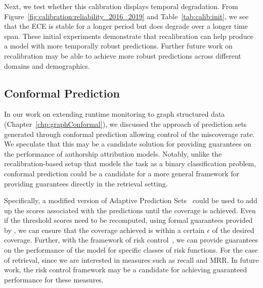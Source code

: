 Next, we test whether this calibration displays temporal degradation.
From Figure~\ref{fig:calibration:reliability_2016_2019} and Table~\ref{tab:calib:init}, we see that the ECE is stable for a longer period but does degrade over a longer time span.
These initial experiments demonstrate that recalibration can help produce a model with more temporally robust predictions.
Further future work on recalibration may be able to achieve more robust predictions across different domains and demographics.

\subsection{Conformal Prediction}
In our work on extending runtime monitoring to graph structured data (Chapter~\ref{chp:graphConformal}), we discussed the approach of prediction sets generated through conformal prediction allowing control of the miscoverage rate.
We speculate that this may be a candidate solution for providing guarantees on the performance of authorship attribution models.
Notably, unlike the recalibration-based setup that models the task as a binary classification problem, conformal prediction could be a candidate for a more general framework for providing guarantees directly in the retrieval setting.

Specifically, a modified version of Adaptive Prediction Sets~\cite{romano2020classification} could be used to add up the scores associated with the predictions until the coverage is achieved.
Even if the threshold scores need to be recomputed, using formal guarantees provided by \citep{vovk2005algorithmic}, we can ensure that the coverage achieved is within a certain $\epsilon$ of the desired coverage.
Further, with the framework of risk control~\cite{angelopoulos2024conformal}, we can provide guarantees on the performance of the model for specific classes of risk functions.
For the case of retrieval, since we are interested in measures such as recall and MRR.
In future work, the risk control framework may be a candidate for achieving guaranteed performance for these measures.

